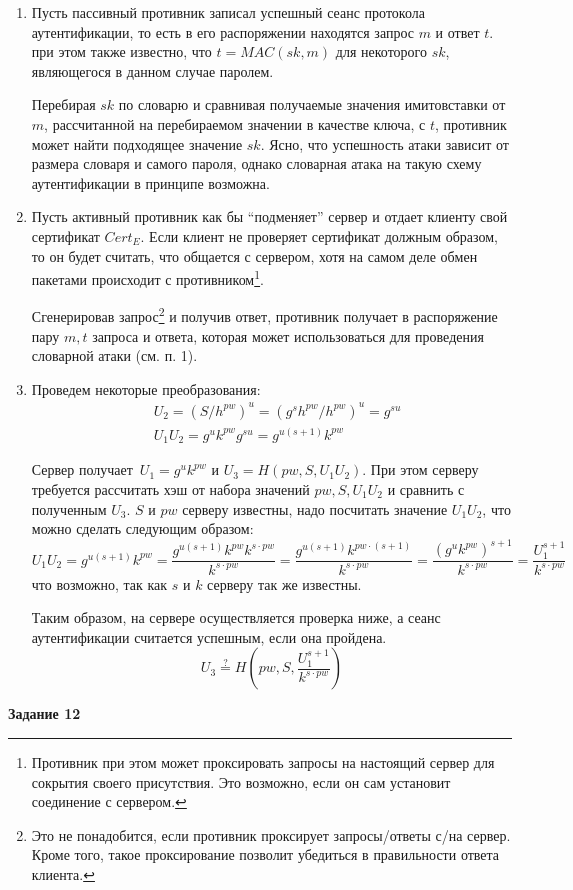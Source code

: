 \documentclass[12pt, a4paper]{extarticle}
\newenvironment*{dummyenv}{}{}
\newcommand{\mysection}[1]{
    \addcontentsline{toc}{section}{#1}
    \begin{dummyenv}
        \bfseries\large #1
    \end{dummyenv}
}
\begin{document}
\begin{enumerate}
	\item Пусть пассивный противник записал успешный сеанс протокола аутентификации, то есть в его
		распоряжении находятся запрос $m$ и ответ $t$. при этом также известно, что $t = MAC(sk, m)$
		для некоторого $sk$, являющегося в данном случае паролем.
		
		Перебирая $sk$ по словарю и сравнивая получаемые значения имитовставки от $m$, рассчитанной
		на перебираемом значении в качестве ключа, с $t$, противник может найти подходящее значение
		$sk$. Ясно, что успешность атаки зависит от размера словаря и самого пароля, однако словарная
		атака на такую схему аутентификации в принципе возможна.
		
	\item Пусть активный противник как бы ``подменяет'' сервер и отдает клиенту свой сертификат
		$Cert_E$. Если клиент не проверяет сертификат должным образом, то он будет считать, что
		общается с сервером, хотя на самом деле обмен пакетами происходит с противником\footnote{
		Противник при этом может проксировать запросы на настоящий сервер для сокрытия своего
		присутствия. Это возможно, если он сам установит соединение с сервером.}.
		
		Сгенерировав запрос\footnote{Это не понадобится, если противник проксирует запросы/ответы 
		с/на сервер. Кроме того, такое проксирование позволит убедиться в правильности ответа
		клиента.} и получив ответ, противник получает в распоряжение пару $m, t$ запроса
		и ответа, которая может использоваться для проведения словарной атаки (см. п. 1). 
	
	\item Проведем некоторые преобразования:
		\begin{equation*}
			\begin{split}
				& U_2 = (S / h^{pw})^u = (g^s h^{pw} / h^{pw})^u = g^{su} \\
				& U_1 U_2 = g^u k^{pw} g^{su} = g^{u(s + 1)} k^{pw}
			\end{split}
		\end{equation*}
		
		Сервер получает $U_1 = g^u k^{pw}$ и $U_3 = H(pw, S, U_1 U_2)$. При этом серверу требуется
		рассчитать хэш от набора значений $pw, S, U_1 U_2$ и сравнить с полученным $U_3$. $S$ и 
		$pw$ серверу известны, надо посчитать значение $U_1 U_2$, что можно сделать следующим
		образом:
		\begin{equation*}
			U_1 U_2 = g^{u(s + 1)} k^{pw} = \frac{g^{u(s + 1)} k^{pw} k^{s \cdot pw}}{k^{s \cdot pw}} =
				\frac{g^{u(s + 1)} k^{pw \cdot (s + 1)}}{k^{s \cdot pw}} =
				\frac{(g^u k^{pw})^{s + 1}}{k^{s \cdot pw}} = 
				\frac{U_1^{s + 1}}{k^{s \cdot pw}}	
		\end{equation*}
		что возможно, так как $s$ и $k$ серверу так же известны.
		
		Таким образом, на сервере осуществляется проверка ниже, а сеанс аутентификации считается
		успешным, если она пройдена.
		\begin{equation*}
			U_3 \stackrel{?}{=} H\left(pw, S, \frac{U_1^{s + 1}}{k^{s \cdot pw}}\right)
		\end{equation*}
\end{enumerate}

\mysection{Задание 12}
\end{document}
